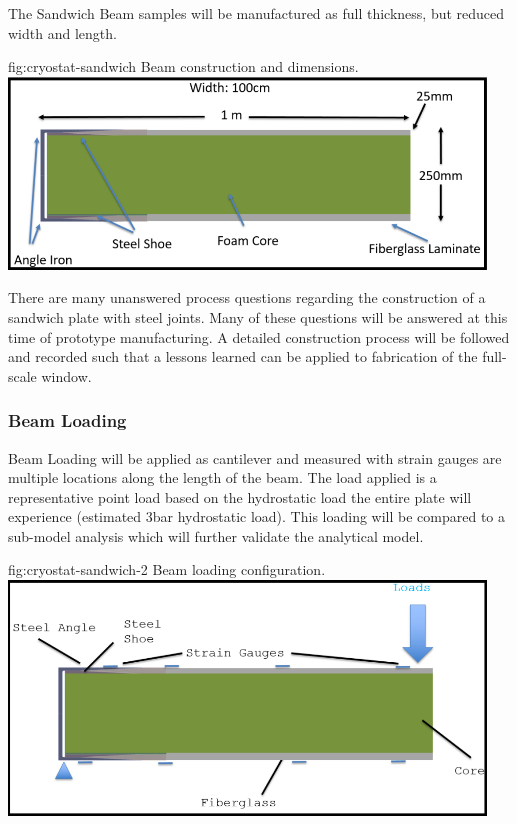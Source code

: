 The Sandwich Beam samples will be manufactured as full thickness, but reduced width and length.

\begin{dunefigure}{fig:cryostat-sandwich}
{Beam construction and dimensions.}
\includegraphics[width=0.95\textwidth]{graphics/cryostat/cryostat-sandwich.PNG}
\end{dunefigure}

There are many unanswered process questions regarding the construction of a sandwich plate
with steel joints. Many of these questions will be answered at this time of prototype manufacturing.
A detailed construction process will be followed and recorded such that a lessons learned can be
applied to fabrication of the full-scale window.

\subsubsection{Beam Loading}
\label{sec:cryost-proto-sandbeam-load}

Beam Loading will be applied as cantilever and measured with strain gauges are multiple locations
along the length of the beam. The load applied is a representative point load based on the hydrostatic
load the entire plate will experience (estimated 3bar hydrostatic load). This loading will be compared
to a sub-model analysis which will further validate the analytical model.

\begin{dunefigure}{fig:cryostat-sandwich-2}
{Beam loading configuration.}
\includegraphics[width=0.95\textwidth]{graphics/cryostat/cryostat-sandwich-2.PNG}
\end{dunefigure}

